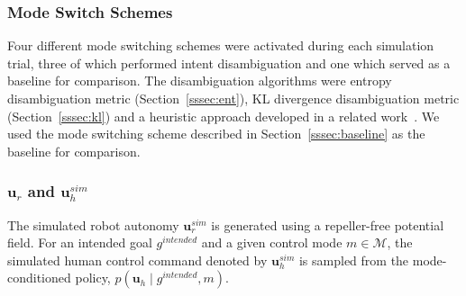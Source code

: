 \documentclass[conference]{IEEEtran}
\DeclareMathOperator*{\argmax}{argmax}
\begin{document}
\subsubsection{Mode Switch Schemes}
Four different mode switching schemes were activated during each simulation trial, three of which performed intent disambiguation and one which served as a baseline for comparison. The disambiguation algorithms were entropy disambiguation  metric (Section~\ref{sssec:ent}), KL divergence disambiguation metric (Section~\ref{sssec:kl}) and a heuristic approach developed in a related work~\citep{gopinath2017mode}. We used the mode switching scheme described in Section~\ref{sssec:baseline} as the baseline for comparison. 
\subsubsection{$\boldsymbol{u}_r$ and $\boldsymbol{u}_h^{sim}$}
The simulated robot autonomy $\boldsymbol{u}^{sim}_r$ is generated using a repeller-free potential field. For an intended goal $g^{intended}$ and a given control mode $m \in \mathcal{M}$, the simulated human control command denoted by $\boldsymbol{u}^{sim}_h$ is sampled from the mode-conditioned policy, $p(\boldsymbol{u}_h\;|\;g^{intended}, m)$. 
\end{document}
